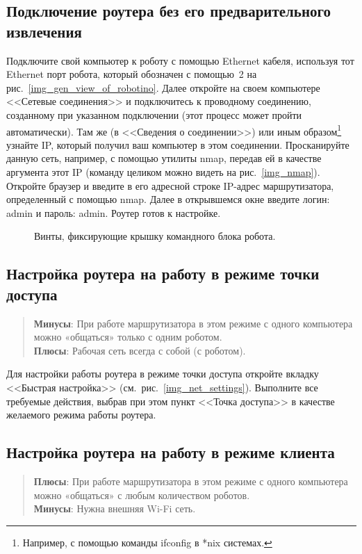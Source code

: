 \subsection{Подключение роутера без его предварительного извлечения}\label{part_without_removing}
Подключите свой компьютер к роботу с помощью Ethernet кабеля, используя тот Ethernet порт робота, который обозначен с помощью~2 на рис.~\ref{img_gen_view_of_robotino}.
Далее откройте на своем компьютере <<Сетевые соединения>> и подключитесь к проводному соединению, созданному при указанном подключении (этот процесс может пройти автоматически).
Там же (в <<Сведения о соединении>>) или иным образом\footnote{Например, с помощью команды ifconfig в *nix системах.} узнайте IP, который получил ваш компьютер в этом соединении.
Просканируйте данную сеть, например, с помощью утилиты nmap, передав ей в качестве аргумента этот IP (команду целиком можно видеть на рис.~\ref{img_nmap}).
Откройте браузер и введите в его адресной строке IP-адрес маршрутизатора, определенный с помощью nmap.
Далее в открывшемся окне введите логин: admin и пароль: admin.
Роутер готов к настройке.

\begin{figure}[h]
	\hfill
	\caption{Винты, фиксирующие крышку командного блока робота.}
	\label{img_remove_cover}
\end{figure}




\subsection{Настройка роутера на работу в режиме точки доступа}
\begin{quote}
\textbf{Минусы}: При работе маршрутизатора в этом режиме с одного компьютера можно «общаться» только с одним роботом.\\
\textbf{Плюсы}: Рабочая сеть всегда с собой (с роботом).
\end{quote}

Для настройки работы роутера в режиме точки доступа откройте вкладку <<Быстрая настройка>> (см.~рис.~\ref{img_net_settings}).
Выполните все требуемые действия, выбрав при этом пункт <<Точка доступа>> в качестве желаемого режима работы роутера.



\subsection{Настройка роутера на работу в режиме клиента}
\begin{quote}
\textbf{Плюсы}: При работе маршрутизатора в этом режиме с одного компьютера можно «общаться» с любым количеством роботов.\\
\textbf{Минусы}: Нужна внешняя Wi-Fi сеть.
\end{quote}


